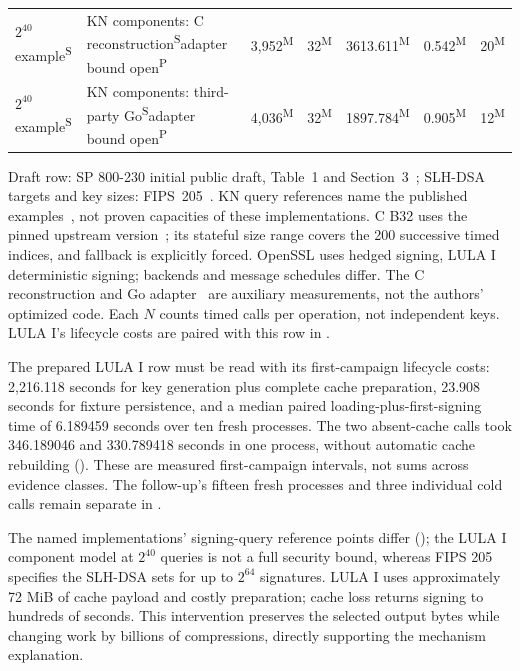 \begin{table}[!htbp]
\begin{tabular}{P{20mm}P{25mm}rrrrr}
$2^{40}$ example\textsuperscript{S} & KN components: C reconstruction\textsuperscript{S}\newline adapter bound open\textsuperscript{P} & 3,952\textsuperscript{M} & 32\textsuperscript{M} & 3613.611\textsuperscript{M} & 0.542\textsuperscript{M} & 20\textsuperscript{M}\\
$2^{40}$ example\textsuperscript{S} & KN components: third-party Go\textsuperscript{S}\newline adapter bound open\textsuperscript{P} & 4,036\textsuperscript{M} & 32\textsuperscript{M} & 1897.784\textsuperscript{M} & 0.905\textsuperscript{M} & 12\textsuperscript{M}\\
\bottomrule\end{tabular}
\smallskip\par\raggedright\footnotesize Draft row: SP 800-230 initial public draft, Table~1 and Section~3~\cite{sp800230}; SLH-DSA targets and key sizes: FIPS~205~\cite{fips205}. KN query references name the published examples~\cite[Table~1]{kn}, not proven capacities of these implementations. C B32 uses the pinned upstream version~\cite{shrincsc}; its stateful size range covers the 200 successive timed indices, and fallback is explicitly forced. OpenSSL uses hedged signing, LULA I deterministic signing; backends and message schedules differ. The C reconstruction and Go adapter~\cite{hashsiggo} are auxiliary measurements, not the authors' optimized code. Each $N$ counts timed calls per operation, not independent keys. LULA I's lifecycle costs are paired with this row in .
\end{table}


\noindent The prepared LULA I row must be read with its first-campaign lifecycle costs: 2,216.118 seconds for key generation plus complete cache preparation, 23.908 seconds for fixture persistence, and a median paired loading-plus-first-signing time of 6.189459 seconds over ten fresh processes. The two absent-cache calls took 346.189046 and 330.789418 seconds in one process, without automatic cache rebuilding (). These are measured first-campaign intervals, not sums across evidence classes. The follow-up's fifteen fresh processes and three individual cold calls remain separate in .

The named implementations' signing-query reference points differ (); the LULA I component model at $2^{40}$ queries is not a full security bound, whereas FIPS 205 specifies the SLH-DSA sets for up to $2^{64}$ signatures. LULA I uses approximately 72 MiB of cache payload and costly preparation; cache loss returns signing to hundreds of seconds. This intervention preserves the selected output bytes while changing work by billions of compressions, directly supporting the mechanism explanation.

